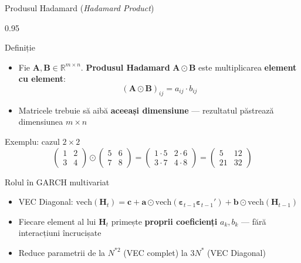 \documentclass[9pt, aspectratio=169, t]{beamer}
\begin{document}
\begin{frame}{Produsul Hadamard (\textit{Hadamard Product})}
    \begin{cminipage}{0.95\textwidth}
    {\footnotesize
    \begin{block}{Definiție}
        \begin{itemize}\setlength{\itemsep}{0pt}
            \item Fie $\mathbf{A}, \mathbf{B} \in \mathbb{R}^{m \times n}$. \textbf{Produsul Hadamard} $\mathbf{A} \odot \mathbf{B}$ este multiplicarea \textbf{element cu element}:
            \[
                (\mathbf{A} \odot \mathbf{B})_{ij} = a_{ij} \cdot b_{ij}
            \]
            \item Matricele trebuie să aibă \textbf{aceeași dimensiune} --- rezultatul păstrează dimensiunea $m \times n$
        \end{itemize}
    \end{block}
    \begin{block}{Exemplu: cazul $2 \times 2$}
        \[
            \begin{pmatrix} 1 & 2 \\ 3 & 4 \end{pmatrix} \odot \begin{pmatrix} 5 & 6 \\ 7 & 8 \end{pmatrix} = \begin{pmatrix} 1 \cdot 5 & 2 \cdot 6 \\ 3 \cdot 7 & 4 \cdot 8 \end{pmatrix} = \begin{pmatrix} 5 & 12 \\ 21 & 32 \end{pmatrix}
        \]
    \end{block}
    \begin{alertblock}{Rolul în GARCH multivariat}
        \begin{itemize}\setlength{\itemsep}{0pt}
            \item VEC Diagonal: $\text{vech}(\mathbf{H}_t) = \mathbf{c} + \mathbf{a} \odot \text{vech}(\boldsymbol{\varepsilon}_{t-1}\boldsymbol{\varepsilon}_{t-1}') + \mathbf{b} \odot \text{vech}(\mathbf{H}_{t-1})$
            \item Fiecare element al lui $\mathbf{H}_t$ primește \textbf{proprii coeficienți} $a_k, b_k$ --- fără interacțiuni încrucișate
            \item Reduce parametrii de la $N^{*2}$ (VEC complet) la $3N^*$ (VEC Diagonal)
        \end{itemize}
    \end{alertblock}
    }
    \end{cminipage}
\end{frame}
\end{document}
